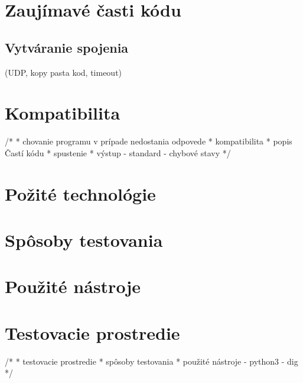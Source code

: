\section{Zaujímavé časti kódu}
\label{Zaujímavé časti kódu}

\subsection{Vytváranie spojenia}
\label{Vytváranie spojenia}
(UDP, kopy pasta kod, timeout)





\section{Kompatibilita}
\label{Kompatibilita}
/*
 * chovanie programu v prípade nedostania odpovede
 * kompatibilita
 * popis Častí kódu 
 * spustenie
 * výstup   - standard
            - chybové stavy
 */

\section{Požité technológie}
\label{Použité technológie}




\section{Spôsoby testovania}
\label{Spôsoby testovania}

\section{Použité nástroje}
\label{Použité nástroje}

\section{Testovacie prostredie}
\label{Testovacaie prostrede}

/*
 * testovacie prostredie
 * spôsoby testovania
 * použité nástroje - python3
                    - dig 
 */



